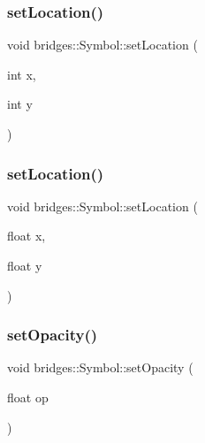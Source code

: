 \subsubsection{\texorpdfstring{setLocation()}{setLocation()}\hspace{0.1cm}{\footnotesize\ttfamily [1/2]}}
{\footnotesize\ttfamily void bridges\+::\+Symbol\+::set\+Location (\begin{DoxyParamCaption}\item[{int}]{x,  }\item[{int}]{y }\end{DoxyParamCaption})\hspace{0.3cm}{\ttfamily [inline]}}

\mbox{\label{classbridges_1_1_symbol_a5f774c3cbd407bc74d43e8d27bb6933f}} 
\subsubsection{\texorpdfstring{setLocation()}{setLocation()}\hspace{0.1cm}{\footnotesize\ttfamily [2/2]}}
{\footnotesize\ttfamily void bridges\+::\+Symbol\+::set\+Location (\begin{DoxyParamCaption}\item[{float}]{x,  }\item[{float}]{y }\end{DoxyParamCaption})\hspace{0.3cm}{\ttfamily [inline]}}

\mbox{\label{classbridges_1_1_symbol_a586939c47e544093cbd8f443bed8dfee}} 
\subsubsection{\texorpdfstring{setOpacity()}{setOpacity()}}
{\footnotesize\ttfamily void bridges\+::\+Symbol\+::set\+Opacity (\begin{DoxyParamCaption}\item[{float}]{op }\end{DoxyParamCaption})\hspace{0.3cm}{\ttfamily [inline]}}

